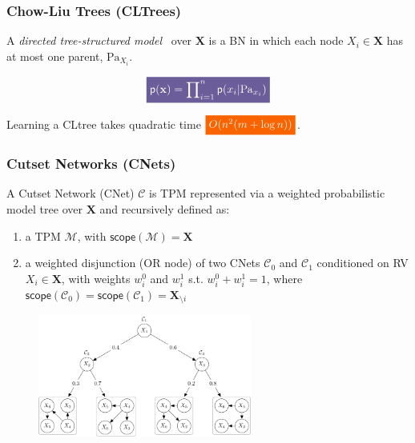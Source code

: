 \documentclass[xcolor={usenames,dvipsnames,svgnames}, compress]{beamer}
\newcommand{\highlight}[2][yellow]{\mathchoice%
  {\colorbox{#1}{\strut\textcolor{white}{$\displaystyle{#2}$}}}%
  {\colorbox{#1}{\strut\textcolor{white}{$\textstyle{#2}$}}}%
  {\colorbox{#1}{\strut\textcolor{white}{$\scriptstyle{#2}$}}}%
  {\colorbox{#1}{\strut\textcolor{white}{$\scriptscriptstyle{#2}$}}}}%
\begin{document}
  \begin{frame}[t]
    \frametitle{Chow-Liu Trees (CLTrees)}
\small
    A \emph{directed tree-structured model}~\cite{Meila2000} over
    $\mathbf{X}$ is a BN in which each node $X_{i}\in\mathbf{X}$ has at most one
    parent, $\mathrm{Pa}_{X_i}$.

    $$\highlight[lacamlilac]{\mathsf{p}(\mathbf{x}) =
    \prod\nolimits_{i=1}^n\mathsf{p}(x_i|\mathrm{Pa}_{x_i})}$$

    Learning a \textsf{CLtree} takes  quadratic time $\highlight[gold4]{O(n^2(m + \log n))}$.\par
  \end{frame}

\begin{frame}[t]
  \frametitle{Cutset Networks (CNets)}
\small
  A Cutset Network (CNet) $\mathcal{C}$ is TPM represented via a
    weighted probabilistic model tree over $\mathbf{X}$ and
    recursively defined as:
    \begin{enumerate}
    \item a TPM $\mathcal{M}$, with
      $\mathsf{scope}(\mathcal{M})=\mathbf X$
      \item a weighted  disjunction (OR node) of two CNets $\mathcal C_0$ and $\mathcal C_1$
     conditioned on RV $X_i \in \mathbf X$,  with
    weights $w_i^0$ and $w_i^1$ s.t. $w_i^0 + w_i^1 = 1$,
    where $\mathsf{scope}(\mathcal C_{0})=\mathsf{scope}(\mathcal C_{1})=\mathbf X_{\setminus i}$
    \end{enumerate}
    \begin{figure}
     \centering
     \includegraphics[width=7cm]{figures/csn}
  \label{fig:csn}
\end{figure}
\end{frame}
\end{document}
